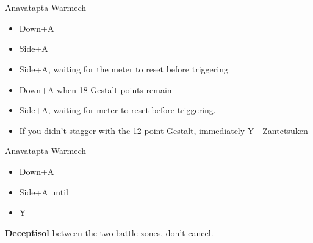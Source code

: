 \chapter[Chapter 12]{}
\begin{paracol}{2}
\begin{battle}{Anavatapta Warmech}
	\begin{itemize}
		\item Down+A
		\item Side+A
		\item Side+A, waiting for the meter to reset before triggering
		\item Down+A when 18 Gestalt points remain
		\item Side+A, waiting for meter to reset before triggering.
		\item If you didn't stagger with the 12 point Gestalt, immediately Y - Zantetsuken
	\end{itemize}
\end{battle}
\switchcolumn
\begin{battle}{Anavatapta Warmech}
	\begin{itemize}
		\item Down+A
		\item Side+A until \stagger
		\item Y
	\end{itemize}
\end{battle}
\switchcolumn*
{}

\textbf{Deceptisol} between the two battle zones, don't cancel.
\switchcolumn
{}


\end{paracol}
